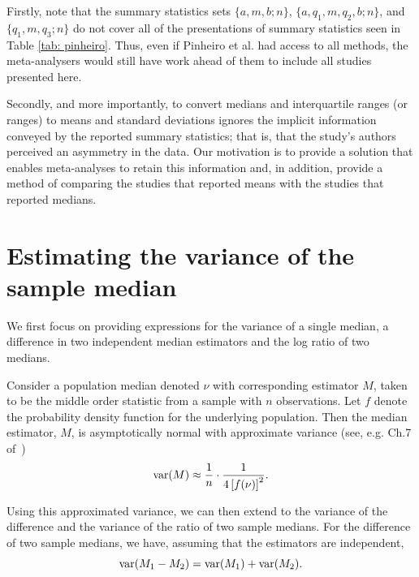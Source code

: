 \documentclass{article}
\begin{document}

Firstly, note that the summary statistics sets $\{a, m, b; n\}$, $\{a, q_1, m, q_2, b; n\}$, and $\{q_1, m, q_3; n\}$ do not cover all of the presentations of summary statistics seen in Table \ref{tab: pinheiro}. Thus, even if Pinheiro et al. had access to all methods, the meta-analysers would still have work ahead of them to include all studies presented here.

Secondly, and more importantly, to convert medians and interquartile ranges (or ranges) to means and standard deviations ignores the implicit information conveyed by the reported summary statistics; that is, that the study's authors perceived an asymmetry in the data. Our motivation is to provide a solution that enables meta-analyses to retain this information and, in addition, provide a method of comparing the studies that reported means with the studies that reported medians.

\section{Estimating the variance of the sample median} \label{sec: est}

We first focus on providing expressions for the variance of a single median, a difference in two independent median estimators and the log ratio of two medians.

Consider a population median denoted $\nu$ with corresponding estimator $M$, taken to be the middle order statistic from a sample with $n$ observations.  Let $f$ denote the probability density function for the underlying population.  Then the median estimator, $M$, is asymptotically normal with approximate variance (see, e.g. Ch.7 of~\cite{dasgupta2008asymptotic})
\begin{equation}\label{eqn: var est}
\operatorname{var}(M)\approx \frac{1}{n}\cdot\frac{1}{4\left[f(\nu)\right]^2}.
\end{equation}


Using this approximated variance, we can then extend to the variance of the difference and the variance of the ratio of two sample medians. For the difference of two sample medians, we have, assuming that the estimators are independent,
\begin{equation}\label{eqn: var diff}
\operatorname{var}(M_1-M_2) = \operatorname{var}(M_1) + \operatorname{var}(M_2).
\end{equation}
\end{document}
